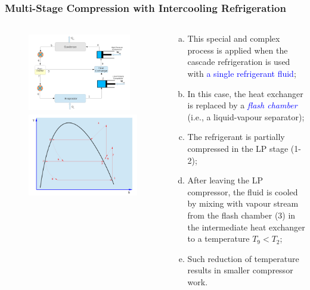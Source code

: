 \documentclass[10pt,compress,handout,ignorenonframetext]{beamer}
\begin{document}
\begin{frame}
 \frametitle{Multi-Stage Compression with Intercooling Refrigeration}
 \begin{columns}
  \begin{column}[c]{0.45\linewidth}
   \begin{figure}%
     \vbox{
      \includegraphics[width=4.5cm,height=3.5cm,clip]{./Pics/Overview_Refrig26}
      \vspace{-.1cm}
      \includegraphics[width=4.cm,height=4.cm,clip]{./Pics/Overview_Refrig27}}
   \end{figure}  
  \end{column}  
  \begin{column}[c]{0.55\linewidth}
   \begin{enumerate}[(a)]
    \item <1-> This special and complex process is applied when the cascade refrigeration is used with \textcolor{blue}{a single refrigerant fluid};
    \item <2-> In this case, the heat exchanger is replaced by a \textcolor{blue}{{\it flash chamber}} (i.e., a liquid-vapour separator);
    \item <3-> The refrigerant is partially compressed in the LP stage (1-2);
    \item <4-> After leaving the LP compressor, the fluid is cooled by mixing with vapour stream from the flash chamber (3) in the intermediate heat exchanger to a temperature $T_{9}<T_{2}$;
    \item <5-> Such reduction of temperature results in smaller compressor work.
   \end{enumerate}
  \end{column}  
 \end{columns} 
\end{frame}
\end{document}

